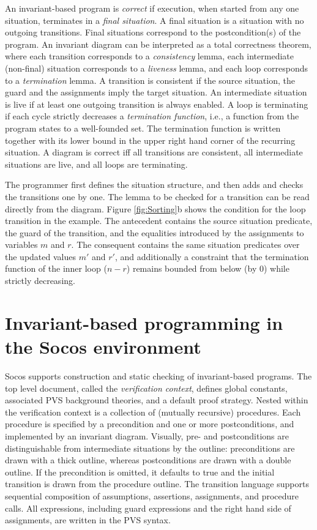 \documentclass[english,submission]{eptcs}
\begin{document}
An invariant-based program is \emph{correct} if execution, when
started from any one situation, terminates in a \emph{final
  situation}. A final situation is a situation with no outgoing
transitions. Final situations correspond to the postcondition(s) of the
program. An invariant diagram can be interpreted as a total
correctness theorem, where each transition corresponds to a
\emph{consistency} lemma, each intermediate (non-final) situation
corresponds to a \emph{liveness} lemma, and each loop corresponds to a
\emph{termination} lemma. A transition is consistent if the source
situation, the guard and the assignments imply the target situation.
An intermediate situation is live if at least one outgoing transition
is always enabled. A loop is terminating if each cycle strictly
decreases a \emph{termination function}, i.e., a function from the
program states to a well-founded set.  The termination function is
written together with its lower bound in the upper right hand corner
of the recurring situation. A diagram is correct iff all transitions
are consistent, all intermediate situations are live, and all loops
are terminating.

The programmer first defines the situation structure, and then adds
and checks the transitions one by one. The lemma to be checked for a
transition can be read directly from the diagram. Figure
\ref{fig:Sorting}b shows the condition for the loop transition in the
example. The antecedent contains the source situation predicate, the
guard of the transition, and the equalities introduced by the
assignments to variables $m$ and $r$. The consequent contains the same
situation predicates over the updated values $m'$ and $r'$, and
additionally a constraint that the termination function of the inner
loop ($n-r$) remains bounded from below (by $0$) while strictly
decreasing.


\section{Invariant-based programming in the Socos environment\label{sec:Invariant-based-programming-in-Socos}}

Socos supports construction and static checking of invariant-based
programs. The top level document, called the \emph{verification
context}, defines global constants, associated PVS background
theories, and a default proof strategy. Nested within the verification
context is a collection of (mutually recursive) procedures. Each
procedure is specified by a precondition and one or more
postconditions, and implemented by an invariant diagram. Visually,
pre- and postconditions are distinguishable from intermediate
situations by the outline: preconditions are drawn with a thick
outline, whereas postconditions are drawn with a double outline. If
the precondition is omitted, it defaults to true and the initial
transition is drawn from the procedure outline. The transition
language supports sequential composition of assumptions, assertions,
assignments, and procedure calls. All expressions, including guard
expressions and the right hand side of assignments, are written in the
PVS syntax.
\end{document}
